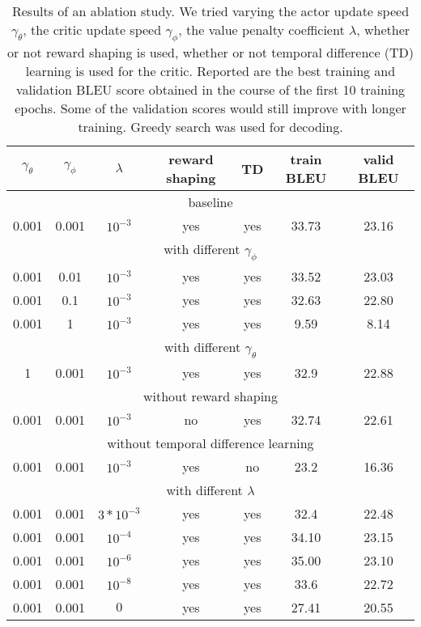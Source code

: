 \begin{table}
    \caption{Results of an ablation study. We tried varying the actor update speed $\gamma_{\theta}$, 
             the critic update speed $\gamma_{\phi}$, the value penalty coefficient $\lambda$, 
             whether or not reward shaping is used, whether or not temporal difference (TD) learning is used
             for the critic. Reported are the best training and validation BLEU score obtained in the course
             of the first 10 training epochs. Some of the validation scores would still improve with longer training.
             Greedy search was used for decoding.}
    \centering
    \begin{tabular}{c  c  c  c  c  c c}
        $\gamma_{\theta}$ & $\gamma_{\phi}$ & $\lambda$ & reward shaping & TD & train BLEU & valid BLEU \\
        \hline
        \multicolumn{7}{c}{baseline} \\
        0.001 & 0.001 & $10^{-3}$ & yes & yes & 33.73 & 23.16 \\
        \hline
        \multicolumn{7}{c}{with different $\gamma_{\phi}$} \\
        0.001 & 0.01 & $10^{-3}$ & yes & yes & 33.52 & 23.03 \\
        0.001 & 0.1 & $10^{-3}$ & yes & yes & 32.63 & 22.80 \\
        0.001 & 1 & $10^{-3}$ & yes & yes & 9.59 & 8.14 \\
        \hline
        \multicolumn{7}{c}{with different $\gamma_{\theta}$} \\
        1 & 0.001 & $10^{-3}$ & yes & yes & 32.9 & 22.88 \\
        \hline
        \multicolumn{7}{c}{without reward shaping} \\
        0.001 & 0.001 & $10^{-3}$ & no & yes & 32.74 & 22.61 \\
        \hline
        \multicolumn{7}{c}{without temporal difference learning} \\
        0.001 & 0.001 & $10^{-3}$ & yes & no & 23.2 & 16.36 \\
        \hline
        \multicolumn{7}{c}{with different $\lambda$} \\
        0.001 & 0.001 & $3 * 10^{-3}$ & yes & yes & 32.4 & 22.48 \\
        0.001 & 0.001 & $10^{-4}$ & yes & yes & 34.10 & 23.15 \\
        0.001 & 0.001 & $10^{-6}$ & yes & yes & 35.00 & 23.10 \\
        0.001 & 0.001 & $10^{-8}$ & yes & yes & 33.6 & 22.72 \\
        0.001 & 0.001 & $0$ & yes & yes & 27.41 & 20.55 \\
    \end{tabular}
    \label{tab:ablation}
\end{table}

